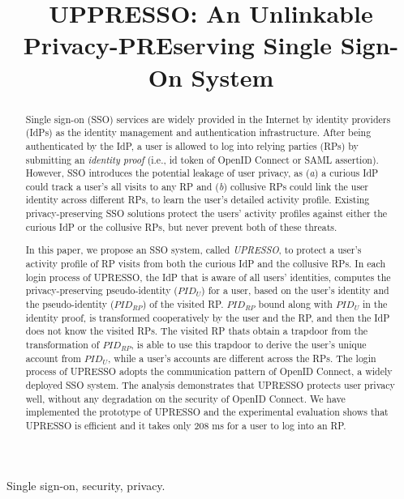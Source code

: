 \documentclass[conference, 10pt]{IEEEtran}
\begin{document}
\title{{UPPRESSO}: An Unlinkable Privacy-PREserving Single Sign-On System}
\maketitle
\begin{abstract}
Single sign-on (SSO) services
     are widely provided in the Internet by identity providers (IdPs) as the identity management
      and authentication infrastructure.
After being authenticated by the IdP,
    a user is allowed to log into relying parties (RPs) by submitting an \emph{identity proof}
    (i.e., id token of OpenID Connect or SAML assertion).
However,
    SSO introduces the potential leakage of user privacy,
        as (\emph{a}) a curious IdP could track a user's all visits to any RP
            and (\emph{b}) collusive RPs could link the user identity across different RPs,
            to learn the user's detailed activity profile.
Existing privacy-preserving SSO solutions protect the users' activity profiles
    against either the curious IdP or the collusive RPs, but never prevent both of these threats.

In this paper, we propose an SSO system, called \emph{UPRESSO},
     to protect a user's activity profile of RP visits
        from both the curious IdP and the collusive RPs.
In each login process of UPRESSO,
 the IdP that is aware of all users' identities,
         computes the privacy-preserving pseudo-identity ($PID_U$) for a user,
    based on the user's identity and the pseudo-identity ($PID_{RP}$) of the visited RP.
$PID_{RP}$ bound along with $PID_U$ in the identity proof,
   is transformed cooperatively by the user and the RP,
    and then the IdP does not know the visited RPs.
The visited RP thats obtain a trapdoor from the transformation of $PID_{RP}$,
    is able to use this trapdoor to derive the user's unique account from $PID_U$,
 while a user's accounts are different across the RPs.
The login process of UPRESSO adopts the communication pattern of OpenID Connect, a widely deployed SSO system.
The analysis demonstrates that UPRESSO protects user privacy well, without any degradation on the security of OpenID Connect.
We have implemented the prototype of UPRESSO and
 the experimental evaluation shows that UPRESSO is efficient and
  it takes only 208 ms for a user to log into an RP.
\end{abstract}
\begin{IEEEkeywords}
Single sign-on, security, privacy. %
\end{IEEEkeywords}
\end{document}
